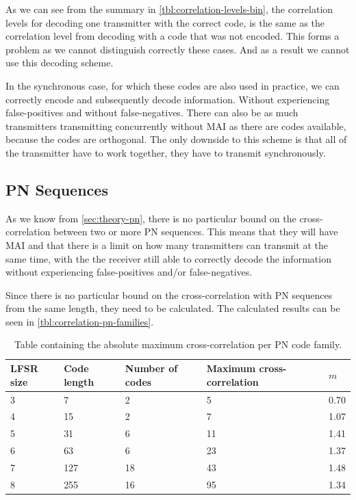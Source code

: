 		As we can see from the summary in \autoref{tbl:correlation-levels-bin}, the correlation levels for decoding one transmitter with the correct code, is the same as the correlation level from decoding with a code that was not encoded.
		This forms a problem as we cannot distinguish correctly these cases.
		And as a result we cannot use this decoding scheme. 


		In the synchronous case, for which these codes are also used in practice, we can correctly encode and subsequently decode information. 
		Without experiencing false-positives and without false-negatives.
		There can also be as much transmitters transmitting concurrently without MAI as there are codes available, because the codes are orthogonal.
		The only downside to this scheme is that all of the transmitter have to work together, they have to transmit synchronously.





	\subsection{PN Sequences}

		As we know from \autoref{sec:theory-pn}, there is no particular bound on the cross-correlation between two or more PN sequences.
		This means that they will have MAI and that there is a limit on how many transmitters can transmit at the same time, with the the receiver still able to correctly decode the information without experiencing false-positives and/or false-negatives.

		Since there is no particular bound on the cross-correlation with PN sequences from the same length, they need to be calculated.
		The calculated results can be seen in \autoref{tbl:correlation-pn-families}.


		\begin{table}
			\centering
			\begin{tabular}{ | l | l | l | l | l | }

				\hline
				LFSR size 	& Code length	& Number of codes 	& Maximum cross-correlation & $m$	\\ \hline

				3			& 7				& 2					& 5							& 0.70	\\ \hline	
				4			& 15			& 2					& 7							& 1.07	\\ \hline
				5			& 31			& 6					& 11						& 1.41	\\ \hline
				6			& 63			& 6					& 23						& 1.37	\\ \hline
				7			& 127			& 18				& 43						& 1.48	\\ \hline
				8			& 255			& 16				& 95						& 1.34	\\ \hline	


			\end{tabular}
			\caption{Table containing the absolute maximum cross-correlation per PN code family.}
			\label{tbl:correlation-pn-families}
		\end{table}

